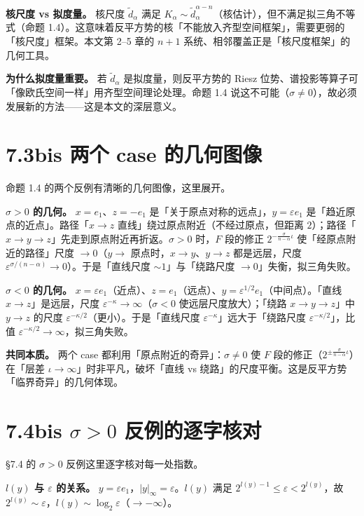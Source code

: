 \documentclass[a4paper,11pt,openany]{ctexbook}
\numberwithin{equation}{chapter}
\numberwithin{figure}{chapter}
\numberwithin{table}{chapter}
\begin{document}
\textbf{核尺度 vs 拟度量。} 核尺度 $\widetilde d_\alpha$ 满足 $K_\alpha\sim\widetilde d_\alpha^{\alpha-n}$（核估计），但不满足拟三角不等式（命题 1.4）。这意味着反平方势的核「不能放入齐型空间框架」，需要更弱的「核尺度」框架。本文第 2–5 章的 $n+1$ 系统、相邻覆盖正是「核尺度框架」的几何工具。

\textbf{为什么拟度量重要。} 若 $\widetilde d_\alpha$ 是拟度量，则反平方势的 Riesz 位势、谱投影等算子可「像欧氏空间一样」用齐型空间理论处理。命题 1.4 说这不可能（$\sigma\neq0$），故必须发展新的方法——这是本文的深层意义。

\section{7.3bis 两个 case 的几何图像}

命题 1.4 的两个反例有清晰的几何图像，这里展开。

\textbf{$\sigma>0$ 的几何。} $x=e_1$、$z=-e_1$ 是「关于原点对称的远点」，$y=\varepsilon e_1$ 是「趋近原点的近点」。路径「$x\to z$ 直线」绕过原点附近（不经过原点，但距离 $2$）；路径「$x\to y\to z$」先走到原点附近再折返。$\sigma>0$ 时，$F$ 段的修正 $2^{-\frac{\sigma}{n-\alpha}\iota}$ 使「经原点附近的路径」尺度 $\to0$（$y\to$ 原点时，$x\to y$、$y\to z$ 都是远层，尺度 $\varepsilon^{\sigma/(n-\alpha)}\to0$）。于是「直线尺度 $\sim1$」与「绕路尺度 $\to0$」失衡，拟三角失败。

\textbf{$\sigma<0$ 的几何。} $x=\varepsilon e_1$（近点）、$z=e_1$（远点）、$y=\varepsilon^{1/2}e_1$（中间点）。「直线 $x\to z$」是远层，尺度 $\varepsilon^{-\kappa}\to\infty$（$\sigma<0$ 使远层尺度放大）；「绕路 $x\to y\to z$」中 $y\to z$ 的尺度 $\varepsilon^{-\kappa/2}$（更小）。于是「直线尺度 $\varepsilon^{-\kappa}$」远大于「绕路尺度 $\varepsilon^{-\kappa/2}$」，比值 $\varepsilon^{-\kappa/2}\to\infty$，拟三角失败。

\textbf{共同本质。} 两个 case 都利用「原点附近的奇异」：$\sigma\neq0$ 使 $F$ 段的修正（$2^{\pm\frac{\sigma}{n-\alpha}\iota}$）在「层差 $\iota\to\infty$」时非平凡，破坏「直线 vs 绕路」的尺度平衡。这是反平方势「临界奇异」的几何体现。

\section{7.4bis $\sigma>0$ 反例的逐字核对}

§7.4 的 $\sigma>0$ 反例这里逐字核对每一处指数。

\textbf{$l(y)$ 与 $\varepsilon$ 的关系。} $y=\varepsilon e_1$，$|y|_\infty=\varepsilon$。$l(y)$ 满足 $2^{l(y)-1}\le\varepsilon<2^{l(y)}$，故 $2^{l(y)}\sim\varepsilon$，$l(y)\sim\log_2\varepsilon$（$\to-\infty$）。
\end{document}

